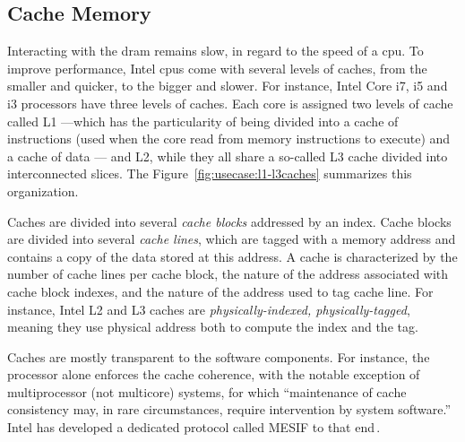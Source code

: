 \subsection{Cache Memory}
\label{subsec:usecase:cachemem}
%
Interacting with the \ac{dram} remains slow, in regard to the speed of a
\ac{cpu}.
%
To improve performance, Intel \acp{cpu} come with several levels of caches, from
the smaller and quicker, to the bigger and slower.
%
For instance, Intel Core i7, i5 and i3 processors have three levels of caches.
%
Each core is assigned two levels of cache called L1 ---which has the
particularity of being divided into a cache of instructions (used when the core
read from memory instructions to execute) and a cache of data --- and L2, while
they all share a so-called L3 cache divided into interconnected slices.
%
The Figure~\ref{fig:usecase:l1-l3caches} summarizes this organization.

Caches are divided into several \emph{cache blocks} addressed by an index.
%
Cache blocks are divided into several \emph{cache lines}, which are tagged with
a memory address and contains a copy of the data stored at this address.
%
A cache is characterized by the number of cache lines per cache block, the
nature of the address associated with cache block indexes, and the nature of the
address used to tag cache line.
%
For instance, Intel L2 and L3 caches are \emph{physically-indexed,
  physically-tagged}, meaning they use physical address both to compute the
index and the tag.

Caches are mostly transparent to the software components.
%
For instance, the processor alone enforces the cache coherence, with the notable
exception of multiprocessor (not multicore) systems, for which ``maintenance of
cache consistency may, in rare circumstances, require intervention by system
software.''
%
Intel has developed a dedicated protocol called MESIF to that
end\,\cite{thomadakis2011nehalem}.

